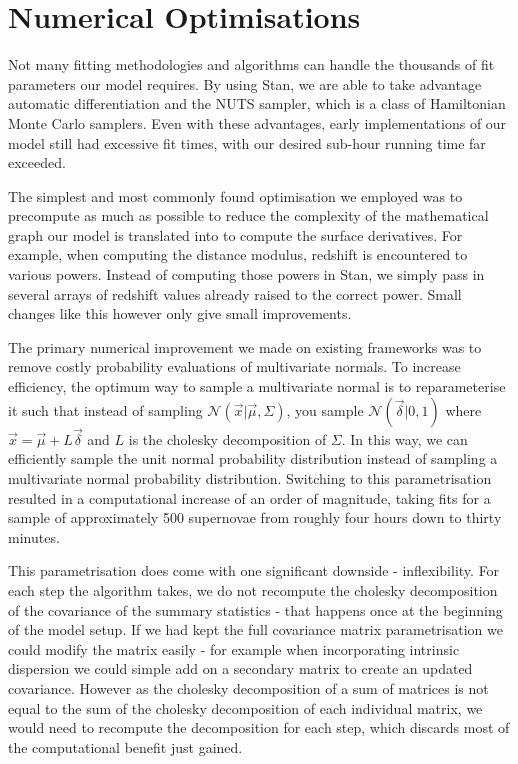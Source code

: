 \documentclass[a4paper,fleqn,usenatbib]{mnras}
\begin{document}
\section{Numerical Optimisations}
\label{app:optimisations}


Not many fitting methodologies and algorithms can handle the thousands of fit parameters our model requires. By using Stan, we are able to take advantage automatic differentiation and the NUTS sampler, which is a class of Hamiltonian Monte Carlo samplers. Even with these advantages, early implementations of our model still had excessive fit times, with our desired sub-hour running time far exceeded. 

The simplest and most commonly found optimisation we employed was to precompute as much as possible to reduce the complexity of the mathematical graph our model is translated into to compute the surface derivatives. For example, when computing the distance modulus, redshift is encountered to various powers. Instead of computing those powers in Stan, we simply pass in several arrays of redshift values already raised to the correct power. Small changes like this however only give small improvements.

The primary numerical improvement we made on existing frameworks was to remove costly probability evaluations of multivariate normals. To increase efficiency, the optimum way to sample a multivariate normal is to reparameterise it such that instead of sampling $\mathcal{N}(\vec{x}|\vec{\mu}, \Sigma)$, you sample $\mathcal{N}(\vec{\delta}|0,1)$ where $\vec{x} = \vec{\mu} + L \vec{\delta}$ and $L$ is the cholesky decomposition of $\Sigma$. In this way, we can efficiently sample the unit normal probability distribution instead of sampling a multivariate normal probability distribution. Switching to this parametrisation resulted in a computational increase of an order of magnitude, taking fits for a sample of approximately 500 supernovae from roughly four hours down to thirty minutes. 

This parametrisation does come with one significant downside - inflexibility. For each step the algorithm takes, we do not recompute the cholesky decomposition of the covariance of the summary statistics - that happens once at the beginning of the model setup. If we had kept the full covariance matrix parametrisation we could modify the matrix easily - for example when incorporating intrinsic dispersion we could simple add on a secondary matrix to create an updated covariance. However as the cholesky decomposition of a sum of matrices is not equal to the sum of the cholesky decomposition of each individual matrix, we would need to recompute the decomposition for each step, which discards most of the computational benefit just gained.
\end{document}
